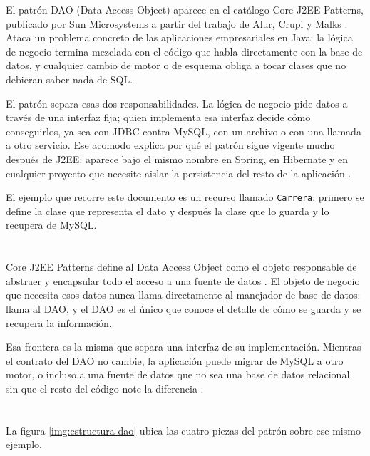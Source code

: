 \documentclass[10pt,a4paper]{article}
\begin{document}
El patrón DAO (Data Access Object) aparece en el catálogo Core J2EE Patterns, publicado por Sun Microsystems a partir del trabajo de Alur, Crupi y Malks \cite{alur2003corej2ee}. Ataca un problema concreto de las aplicaciones empresariales en Java: la lógica de negocio termina mezclada con el código que habla directamente con la base de datos, y cualquier cambio de motor o de esquema obliga a tocar clases que no debieran saber nada de SQL.

El patrón separa esas dos responsabilidades. La lógica de negocio pide datos a través de una interfaz fija; quien implementa esa interfaz decide cómo conseguirlos, ya sea con JDBC contra MySQL, con un archivo o con una llamada a otro servicio. Ese acomodo explica por qué el patrón sigue vigente mucho después de J2EE: aparece bajo el mismo nombre en Spring, en Hibernate y en cualquier proyecto que necesite aislar la persistencia del resto de la aplicación \cite{oracle_dao}.

El ejemplo que recorre este documento es un recurso llamado \texttt{Carrera}: primero se define la clase que representa el dato y después la clase que lo guarda y lo recupera de MySQL.

\section{\color{colorIPN}{Definición formal}}

Core J2EE Patterns define al Data Access Object como el objeto responsable de abstraer y encapsular todo el acceso a una fuente de datos \cite{alur2003corej2ee}. El objeto de negocio que necesita esos datos nunca llama directamente al manejador de base de datos: llama al DAO, y el DAO es el único que conoce el detalle de cómo se guarda y se recupera la información.

Esa frontera es la misma que separa una interfaz de su implementación. Mientras el contrato del DAO no cambie, la aplicación puede migrar de MySQL a otro motor, o incluso a una fuente de datos que no sea una base de datos relacional, sin que el resto del código note la diferencia \cite{oracle_dao}.

\section{\color{colorIPN}{Estructura y componentes}}

La figura \ref{img:estructura-dao} ubica las cuatro piezas del patrón sobre ese mismo ejemplo.
\end{document}

